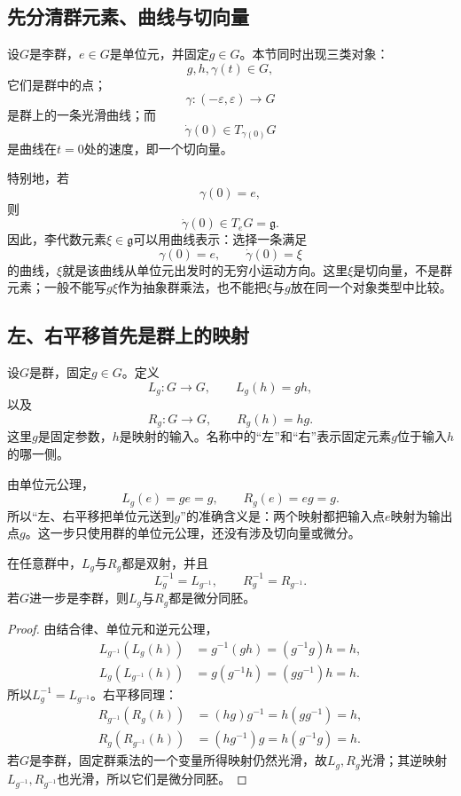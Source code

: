 \subsection{先分清群元素、曲线与切向量}

设$G$是李群，$e\in G$是单位元，并固定$g\in G$。本节同时出现三类对象：
\[
    g,h,\gamma(t)\in G,
\]
它们是群中的点；
\[
    \gamma:(-\varepsilon,\varepsilon)\to G
\]
是群上的一条光滑曲线；而
\[
    \dot\gamma(0)\in T_{\gamma(0)}G
\]
是曲线在$t=0$处的速度，即一个切向量。

特别地，若
\[
    \gamma(0)=e,
\]
则
\[
    \dot\gamma(0)\in T_eG=\mathfrak g.
\]
因此，李代数元素$\xi\in\mathfrak g$可以用曲线表示：选择一条满足
\[
    \gamma(0)=e,
    \qquad
    \dot\gamma(0)=\xi
\]
的曲线，$\xi$就是该曲线从单位元出发时的无穷小运动方向。这里$\xi$是切向量，不是群元素；一般不能写$g\xi$作为抽象群乘法，也不能把$\xi$与$g$放在同一个对象类型中比较。

\subsection{左、右平移首先是群上的映射}

\begin{definition}[左平移与右平移]
设$G$是群，固定$g\in G$。定义
\[
    L_g:G\to G,
    \qquad
    L_g(h)=gh,
\]
以及
\[
    R_g:G\to G,
    \qquad
    R_g(h)=hg.
\]
这里$g$是固定参数，$h$是映射的输入。名称中的“左”和“右”表示固定元素$g$位于输入$h$的哪一侧。
\end{definition}

由单位元公理，
\[
    L_g(e)=ge=g,
    \qquad
    R_g(e)=eg=g.
\]
所以“左、右平移把单位元送到$g$”的准确含义是：两个映射都把输入点$e$映射为输出点$g$。这一步只使用群的单位元公理，还没有涉及切向量或微分。

\begin{proposition}[左、右平移的双射与微分同胚性]
在任意群中，$L_g$与$R_g$都是双射，并且
\[
    L_g^{-1}=L_{g^{-1}},
    \qquad
    R_g^{-1}=R_{g^{-1}}.
\]
若$G$进一步是李群，则$L_g$与$R_g$都是微分同胚。
\end{proposition}

\begin{proof}
由结合律、单位元和逆元公理，
\[
\begin{aligned}
    L_{g^{-1}}(L_g(h))
    &=g^{-1}(gh)=(g^{-1}g)h=h,\\
    L_g(L_{g^{-1}}(h))
    &=g(g^{-1}h)=(gg^{-1})h=h.
\end{aligned}
\]
所以$L_g^{-1}=L_{g^{-1}}$。右平移同理：
\[
\begin{aligned}
    R_{g^{-1}}(R_g(h))
    &=(hg)g^{-1}=h(gg^{-1})=h,\\
    R_g(R_{g^{-1}}(h))
    &=(hg^{-1})g=h(g^{-1}g)=h.
\end{aligned}
\]
若$G$是李群，固定群乘法的一个变量所得映射仍然光滑，故$L_g,R_g$光滑；其逆映射$L_{g^{-1}},R_{g^{-1}}$也光滑，所以它们是微分同胚。
\end{proof}

